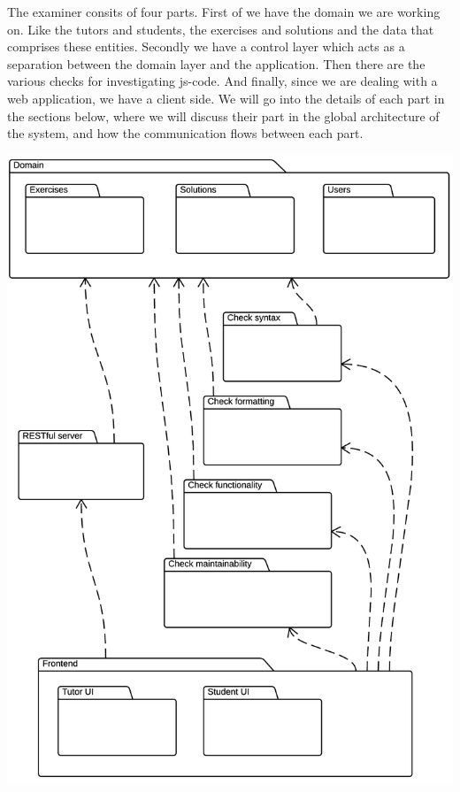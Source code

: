 %

The \gls{examiner} consits of four parts.
First of we have the domain we are working on.
Like the tutors and students, the exercises and solutions
and the data that comprises these entities.
Secondly we have a control layer
which acts as a separation between the domain layer and the application.
Then there are the various checks for investigating \gls{js-code}.
And finally, since we are dealing with a web application,
we have a client side.
We will go into the details of each part in the sections below,
where we will discuss their part in the global architecture of the system,
and how the communication flows between each part.

\includegraphics[scale=0.75] {diagrams-images/architecture}

